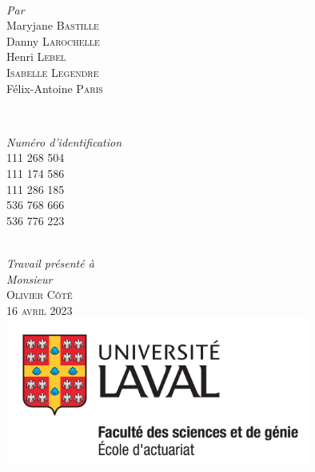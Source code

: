\begin{titlepage}
\HRule \\[2cm]
\begin{minipage}{0.4\textwidth}
    \begin{flushleft} \large
    \emph{Par}\\
        Maryjane \textsc{Bastille}\\
    	 Danny \textsc{Larochelle}\\
        Henri \textsc{Lebel\\
        Isabelle \textsc{Legendre}}\\
        Félix-Antoine \textsc{Paris}
    \end{flushleft}
\end{minipage}
~%
\begin{minipage}{0.4\textwidth}
    \begin{flushright} \large
    \emph{Numéro d'identification}\\
        111 268 504\\
        111 174 586\\
        111 286 185\\
        536 768 666\\
        536 776 223
    \end{flushright}
\end{minipage} \\[1.0cm]
\emph{Travail présenté à} \\
\emph{Monsieur} \\[0.1cm]
\textsc{\Large Olivier} \textsc{Côté}\\[1.0cm]
\textsc{\large 16 avril 2023}\\[1cm] %

\includegraphics[width = 10cm]{ul-actuariat}\\[1.5cm]
 
\vfill %

\end{titlepage}
%